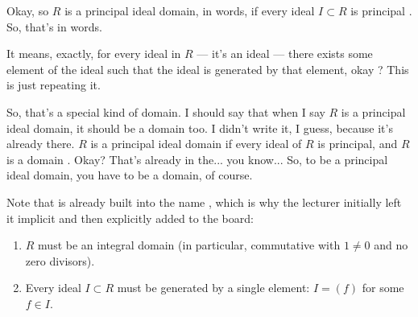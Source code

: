 \begin{speech}[00:37:40 - 00:38:51]
Okay, so $R$ is a principal ideal domain, in words, if every ideal $I \subset R$ is principal . So, that's in words.

It means, exactly, for every ideal in $R$ --- it's an ideal --- there exists some element of the ideal such that the ideal is generated by that element, okay ? This is just repeating it.

So, that's a special kind of domain. I should say that when I say $R$ is a principal ideal domain, it should be a domain too. I didn't write it, I guess, because it's already there. $R$ is a principal ideal domain if every ideal of $R$ is principal, and $R$ is a domain . Okay? That's already in the... you know... So, to be a principal ideal domain, you have to be a domain, of course.
\end{speech}

\begin{content}

\begin{steps}
Note that  is already built into the name , which is why the lecturer initially left it implicit and then explicitly added  to the board:
\begin{enumerate}[label=\textbf{\arabic*.}]
    \setcounter{enumi}{0} \item $R$ must be an integral domain (in particular, commutative with $1 \neq 0$ and no zero divisors).
    \setcounter{enumi}{1} \item Every ideal $I \subset R$ must be generated by a single element: $I = (f)$ for some $f \in I$.
\end{enumerate}
\end{steps}
\end{content}

